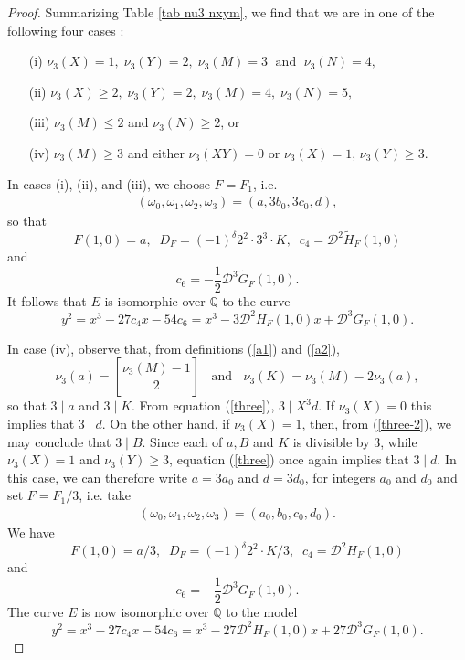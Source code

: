 \begin{proof}
Summarizing Table \ref{tab nu3 nxym},  we find that we are in one of the following four cases :

\begin{enumerate}
\item[(i)] $\nu_3 (X)=1, \;  \nu_3(Y) =2,  \; \nu_3(M)=3 \; \mbox{ and } \;  \nu_3(N)=4,$
\item[(ii)] $\nu_3(X) \geq 2, \;  \nu_3(Y) =2, \; \nu_3(M) =4, \; \nu_3(N)=5,$
\item[(iii)] $\nu_3(M) \leq 2 $ and $ \nu_3(N) \geq 2$, or
\item[(iv)] $\nu_3 (M)  \geq 3$ and either $\nu_3 (XY)=0 $ or $\nu_3(X)=1, \,  \nu_3(Y) \geq 3$.
\end{enumerate}
In cases (i), (ii), and (iii), we choose $F=F_1$, i.e.
\begin{align*}
(\omega_0,\omega_1,\omega_2,\omega_3) = (a, 3 b_0, 3 c_0, d),
\end{align*}
so that
\[F(1,0)=a, \; \; D_{F} = (-1)^\delta 2^2 \cdot 3^3 \cdot K, \; \; 
c_4 = \mathcal{D}^2 \widetilde{H}_{F} (1,0)\]
and 
\[c_6 = - \frac{1}{2}  \mathcal{D}^3 \widetilde{G}_{F} (1,0).\]
It follows that $E$ is isomorphic over $\mathbb{Q}$ to the curve
$$
y^2 = x^3 -27 c_4 x -54 c_6 = x^3 - 3 \mathcal{D}^2 H_{F}(1,0) x + \mathcal{D}^3 G_{F}(1,0).
$$

In  case (iv), observe that, from definitions (\ref{a1}) and (\ref{a2}),
\begin{equation} \label{foster}
\nu_3(a) = \left[ \frac{\nu_3(M)-1}{2} \right] \; \; \mbox{ and } \; \; 
\nu_3(K) = \nu_3(M) - 2 \nu_3 (a),
\end{equation}
so that $3 \mid a$ and $3 \mid K$. From equation (\ref{three}),  $3 \mid X^3 d$.
If $\nu_3(X)=0$ this implies that $3 \mid d$. On the other hand, 
if $\nu_3(X)=1$, then, from (\ref{three-2}), we may conclude that $3 \mid B$. Since each of $a, B$ and $K$ is divisible by $3$, while $\nu_3 (X) =1$ and $\nu_3 (Y) \geq 3$,  equation (\ref{three})
once again implies that $3 \mid d$.
In this case, we can therefore write $a = 3a_0$ and $d=3d_0$, for integers $a_0$ and $d_0$ and 
set $F = F_1/3$, i.e. take
\begin{align*}
(\omega_0,\omega_1,\omega_2,\omega_3) = (a_0, b_0, c_0, d_0).
\end{align*}
We have
\[F(1,0) =a/3, \; \;  D_{F}  = (-1)^\delta 2^2  \cdot K/3, \; \; 
c_4 = \mathcal{D}^2 H_{F} (1,0)\]
and 
\[c_6 = - \frac{1}{2}  \mathcal{D}^3 G_{F} (1,0).\]
The curve $E$ is now isomorphic over $\mathbb{Q}$ to the model
$$
y^2 = x^3 -27 c_4 x -54 c_6 = x^3 - 27 \mathcal{D}^2 H_{F}(1,0) x + 27 \mathcal{D}^3 G_{F}(1,0).
$$


\end{proof}
